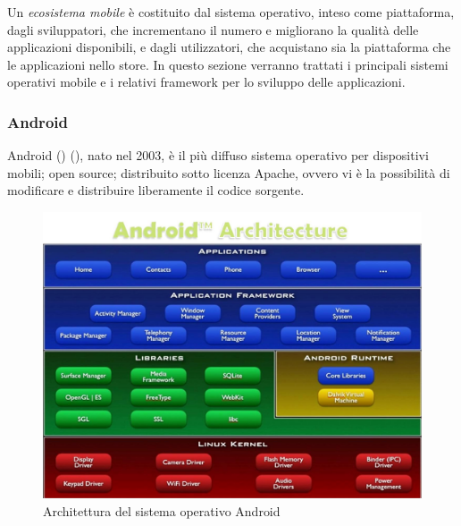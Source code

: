 Un \emph{ecosistema mobile} è costituito dal sistema operativo, inteso come piattaforma, dagli sviluppatori, che incrementano il numero e migliorano la qualità delle applicazioni disponibili, e dagli utilizzatori, che acquistano sia la piattaforma che le applicazioni nello store.
In questo sezione verranno trattati i principali sistemi operativi mobile e i relativi framework per lo sviluppo delle applicazioni.


\subsubsection{Android}
Android (\cite{www:android}) (\cite{book:libro1}), nato nel 2003, è il più diffuso sistema operativo per dispositivi mobili; open source; distribuito sotto licenza Apache, ovvero vi è la possibilità di modificare e distribuire liberamente il codice sorgente.\\
\begin{figure}
\begin{center}
\includegraphics[scale=0.5]{imgs/android_architecture.jpg} 
\caption{Architettura del sistema operativo Android\label{androidarchitecture}}
\end{center}
\end{figure}

